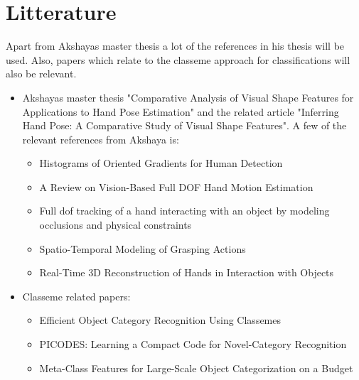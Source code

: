 \documentclass[12pt]{article}
\begin{document}
\section*{Litterature}
Apart from Akshayas master thesis a lot of the references in his thesis will be used. Also, papers which relate to the classeme approach for classifications will also be relevant.
\begin{itemize}
\item
Akshayas master thesis "Comparative Analysis of Visual Shape Features for Applications to Hand Pose Estimation" and the related article "Inferring Hand Pose: A Comparative Study of Visual Shape Features". A few of the relevant references from Akshaya is:
\begin{itemize}
\item
Histograms of Oriented Gradients for Human Detection
\item
A Review on Vision-Based Full DOF Hand Motion Estimation
\item
Full dof tracking of a hand interacting with an object by modeling occlusions and physical constraints
\item
Spatio-Temporal Modeling of Grasping Actions
\item
Real-Time 3D Reconstruction of Hands in Interaction with Objects
\end{itemize}
\item
Classeme related papers:
\begin{itemize}
\item
Efficient Object Category Recognition Using Classemes
\item
PICODES: Learning a Compact Code for Novel-Category Recognition
\item
Meta-Class Features for Large-Scale Object Categorization on a Budget
\end{itemize}
\end{itemize}
\end{document}
